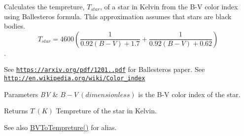 Calculates the tempreture, $T_{star}$, of a star in Kelvin from the B-\/V color index using Ballesteros\textquotesingle{} formula. This approximation assumes that stars are black bodies. \[T_{star}=4600 \left ( \frac{1}{0.92 (B-V)+ 1.7} + \frac{1}{0.92 (B-V) + 0.62} \right )\]. 

See \href{https://arxiv.org/pdf/1201.1809.pdf}{\tt https\+://arxiv.\+org/pdf/1201..\+pdf} for Ballesteros\textquotesingle{} paper. See \href{http://en.wikipedia.org/wiki/Color_index}{\tt http\+://en.\+wikipedia.\+org/wiki/\+Color\+\_\+index}


\begin{DoxyParams}{Parameters}
{\em BV} & $B-V\ (dimensionless)$ is the B-\/V color index of the star. \\
\hline
\end{DoxyParams}
\begin{DoxyReturn}{Returns}
$T\ (K)$ Tempreture of the star in Kelvin. 
\end{DoxyReturn}
\begin{DoxySeeAlso}{See also}
\mbox{\hyperlink{group___e_g_x_phys-_b-_v_color_ga11cf848625fe052fe9250ce2aa22253b}{B\+V\+To\+Tempreture()}} for alias. 
\end{DoxySeeAlso}
